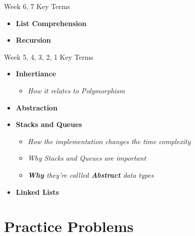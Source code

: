 \documentclass[hyperref={colorlinks,citecolor=blue,linkcolor=blue,urlcolor=blue}, aspectratio=1610]{beamer}
\begin{document}
\begin{frame}{Week 6, 7 Key Terms}
  \begin{itemize}
    \item \textbf{List Comprehension} 
    \item \textbf{Recursion} 
  \end{itemize}
\end{frame}

\begin{frame}{Week 5, 4, 3, 2, 1 Key Terms}
  \begin{itemize}
    \item \textbf{Inhertiance}
    \begin{itemize}
      \item \textit{How it relates to Polymorphism}
    \end{itemize}
    \item \textbf{Abstraction}
    \item \textbf{Stacks and Queues}
    \begin{itemize}
      \item \textit{How the implementation changes the time complexity}
      \item \textit{Why Stacks and Queues are important}
      \item \textit{\textbf{Why} they're callled \textbf{Abstract} data types}
    \end{itemize}
    \item \textbf{Linked Lists}
  \end{itemize}
\end{frame}

\section{Practice Problems}
\end{document}
